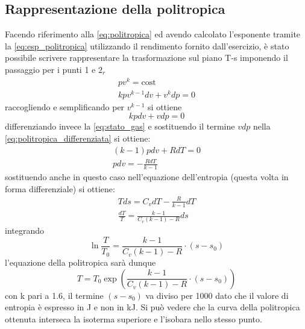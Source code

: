 \documentclass[a4paper,12pt]{article}
\begin{document}
\subsection{Rappresentazione della politropica}
Facendo riferimento alla \eqref{eq:politropica} ed avendo calcolato l'esponente tramite la \eqref{eq:esp_politropica}
utilizzando il rendimento fornito dall'esercizio, è stato possibile scrivere rappresentare la trasformazione sul piano T-s
imponendo il passaggio per i punti 1 e $2_r$
\begin{gather*}
    pv^k = \text{cost} \\
    kpv^{k-1}dv + v^kdp = 0
\end{gather*}
raccogliendo e semplificando per $v^{k-1}$ si ottiene
\begin{equation}
    \label{eq:politropica_differenziata}
    kpdv + vdp = 0
\end{equation}   
differenziando invece la \eqref{eq:stato_gas} e sostituendo il termine $vdp$ nella \eqref{eq:politropica_differenziata}
si ottiene:
\begin{gather*}
    (k-1)pdv + RdT = 0 \\
    pdv = -\frac{RdT}{k-1}
\end{gather*}
sostituendo anche in questo caso nell'equazione dell'entropia (questa volta in forma differenziale)
si ottiene:
\begin{gather*}
    Tds = C_vdT -\frac{R}{k-1}dT \\
    \frac{dT}{T} = \frac{k-1}{C_v(k-1)-R} ds
\end{gather*}
integrando
\begin{equation*}
    \ln\frac{T}{T_0} = \frac{k-1}{C_v(k-1)-R}\cdot(s-s_0)
\end{equation*}
l'equazione della politropica sarà dunque
\begin{equation}
    T = T_0 \exp\left(\frac{k-1}{C_v(k-1)-R}\cdot(s-s_0)\right)
\end{equation}
con k pari a 1.6, il termine $(s-s_0)$ va diviso per 1000 dato che il valore di entropia è espresso in J
e non in kJ.
Si può vedere che la curva della politropica ottenuta interseca la isoterma superiore e
l'isobara nello stesso punto.
\end{document}

